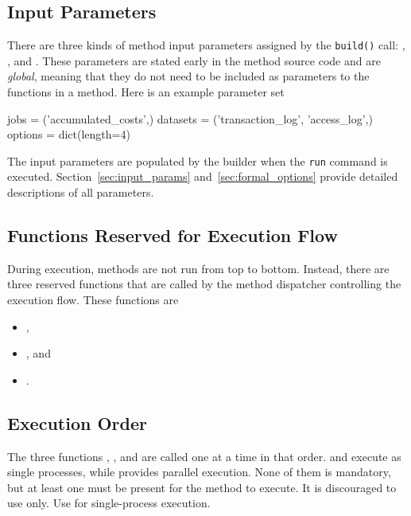 \subsection{Input Parameters}
There are three kinds of method input parameters assigned by the
\texttt{build()} call: \jobs, \datasets, and \options.  These
parameters are stated early in the method source code and are
\textsl{global}, meaning that they do not need to be included as
parameters to the functions in a method.  Here is an example parameter
set
\begin{python}
jobs = ('accumulated_costs',)
datasets = ('transaction_log', 'access_log',)
options = dict(length=4)
\end{python}
The input parameters are populated by the builder when the
\texttt{run} command is executed.  Section~\ref{sec:input_params}
and~\ref{sec:formal_options} provide detailed descriptions of all
parameters.


\subsection{Functions Reserved for Execution Flow}
During execution, methods are not run from top to bottom.  Instead,
there are three reserved functions that are called by the method
dispatcher controlling the execution flow.  These functions are
\begin{itemize}
\item [] \prepare,
\item [] \analysis, and
\item [] \synthesis.
\end{itemize}


\subsection{Execution Order}
The three functions \prepare, \analysis, and \synthesis are called one
at a time in that order.  \prepare and \synthesis execute as single
processes, while \analysis provides parallel execution.  None of them
is mandatory, but at least one must be present for the method to
execute.  It is discouraged to use \prepare only.  Use \synthesis for
single-process execution.



